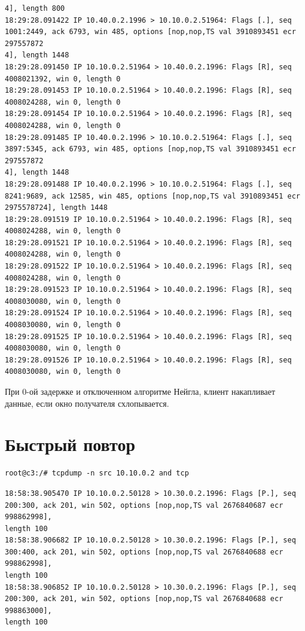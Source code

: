 \documentclass[a4paper,12pt]{article}
\begin{document}
\begin{Verbatim}
4], length 800
18:29:28.091422 IP 10.40.0.2.1996 > 10.10.0.2.51964: Flags [.], seq 1001:2449, ack 6793, win 485, options [nop,nop,TS val 3910893451 ecr 297557872
4], length 1448
18:29:28.091450 IP 10.10.0.2.51964 > 10.40.0.2.1996: Flags [R], seq 4008021392, win 0, length 0
18:29:28.091453 IP 10.10.0.2.51964 > 10.40.0.2.1996: Flags [R], seq 4008024288, win 0, length 0
18:29:28.091454 IP 10.10.0.2.51964 > 10.40.0.2.1996: Flags [R], seq 4008024288, win 0, length 0
18:29:28.091485 IP 10.40.0.2.1996 > 10.10.0.2.51964: Flags [.], seq 3897:5345, ack 6793, win 485, options [nop,nop,TS val 3910893451 ecr 297557872
4], length 1448
18:29:28.091488 IP 10.40.0.2.1996 > 10.10.0.2.51964: Flags [.], seq 8241:9689, ack 12585, win 485, options [nop,nop,TS val 3910893451 ecr 2975578724], length 1448
18:29:28.091519 IP 10.10.0.2.51964 > 10.40.0.2.1996: Flags [R], seq 4008024288, win 0, length 0
18:29:28.091521 IP 10.10.0.2.51964 > 10.40.0.2.1996: Flags [R], seq 4008024288, win 0, length 0
18:29:28.091522 IP 10.10.0.2.51964 > 10.40.0.2.1996: Flags [R], seq 4008024288, win 0, length 0
18:29:28.091523 IP 10.10.0.2.51964 > 10.40.0.2.1996: Flags [R], seq 4008030080, win 0, length 0
18:29:28.091524 IP 10.10.0.2.51964 > 10.40.0.2.1996: Flags [R], seq 4008030080, win 0, length 0
18:29:28.091525 IP 10.10.0.2.51964 > 10.40.0.2.1996: Flags [R], seq 4008030080, win 0, length 0
18:29:28.091526 IP 10.10.0.2.51964 > 10.40.0.2.1996: Flags [R], seq 4008030080, win 0, length 0
\end{Verbatim}

При 0-ой задержке и отключенном алгоритме Нейгла, клиент накапливает данные, если окно получателя схлопывается.

\section{Быстрый повтор}

\begin{Verbatim}
root@c3:/# tcpdump -n src 10.10.0.2 and tcp
\end{Verbatim}

\begin{Verbatim}
18:58:38.905470 IP 10.10.0.2.50128 > 10.30.0.2.1996: Flags [P.], seq 200:300, ack 201, win 502, options [nop,nop,TS val 2676840687 ecr 998862998],
length 100
18:58:38.906682 IP 10.10.0.2.50128 > 10.30.0.2.1996: Flags [P.], seq 300:400, ack 201, win 502, options [nop,nop,TS val 2676840688 ecr 998862998],
length 100
18:58:38.906852 IP 10.10.0.2.50128 > 10.30.0.2.1996: Flags [P.], seq 200:300, ack 201, win 502, options [nop,nop,TS val 2676840688 ecr 998863000],
length 100
\end{Verbatim}
\end{document}
